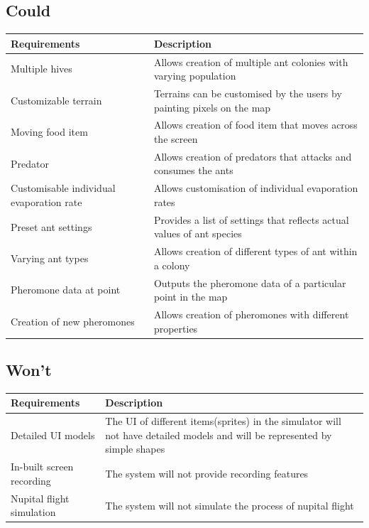 \documentclass[a4paper, oneside, 11pt]{report}
\begin{document}
\subsection{Could}
\begin{tabular}{|| p{3.5cm} | p{10.5cm} ||} 
	\hline
	Requirements & Description \\
	\hline
	Multiple hives & Allows creation of multiple ant colonies with varying population \\
	\hline
	Customizable terrain & Terrains can be customised by the users by painting pixels on the map \\
	\hline
	Moving food item & Allows creation of food item that moves across the screen \\
	\hline
	Predator & Allows creation of predators that attacks and consumes the ants\\
	\hline
	Customisable individual evaporation rate & Allows customisation of individual evaporation rates \\
	\hline
	Preset ant settings & Provides a list of settings that reflects actual values of ant species \\
	\hline
	Varying ant types & Allows creation of different types of ant within a colony \\
	\hline
	Pheromone data at point & Outputs the pheromone data of a particular point in the map\\
	\hline
	Creation of new pheromones & Allows creation of pheromones with different properties\\
	\hline
\end{tabular}

\subsection{Won't}
\begin{tabular}{|| p{3.5cm} | p{10.5cm} ||} 
	\hline
	Requirements & Description \\
	\hline
	Detailed UI models &  The UI of different items(sprites) in the simulator will not have detailed models and will be represented by simple shapes\\
	\hline
	In-built screen recording & The system will not provide recording features \\
	\hline
	Nupital flight simulation & The system will not simulate the process of nupital flight \\
	\hline
\end{tabular}
\end{document}
